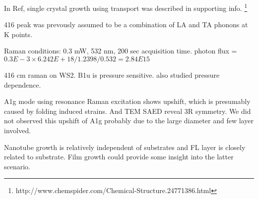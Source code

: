 In Ref\cite{Zeng2013}, single crystal  growth using  transport was described in supporting info.
\footnote{http://www.chemspider.com/Chemical-Structure.24771386.html}



416 peak was prevously assumed to be a combination of LA and TA phonons at K points.

Raman conditions: 0.3 mW, 532 nm, 200 sec acquisition time. photon flux = $0.3E-3\times6.242E+18/1.2398/0.532=2.84E15$

416 cm raman on WS2. B1u is pressure sensitive. \cite{Staiger2012} also studied pressure dependence.

A1g mode using resonance Raman excitation shows upshift, which is presumably caused by folding induced strains. And TEM SAED reveal 3R symmetry. We did not observed this upshift of A1g probably due to the large diameter and few layer involved.

Nanotube growth is relatively independent of substrates and FL layer is closely related to substrate. Film growth could provide some insight into the latter scenario.

\fi